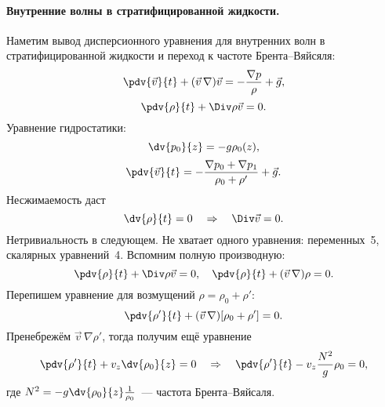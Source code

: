 \paragraph{Внутренние волны в стратифицированной жидкости. } Наметим вывод  дисперсионного уравнения для внутренних волн в стратифицированной жидкости и переход к частоте Брента--Вяйсяля:
\begin{equation}
    \pdv{\vec{v}}{t}+(\vec{v}\,\nabla)\vec{v} = -\frac{\nabla p}{\rho}+\vec{g},
\end{equation}
\begin{equation}
	\pdv{\rho}{t}+\Div \rho \vec{v} = 0.
\end{equation}
Уравнение гидростатики:
\begin{equation}
    \dv{p_0}{z} = -g \rho_0(z),
\end{equation}
\begin{equation}
    \pdv{\vec{v}}{t} = -\frac{\nabla p_0+\nabla p_1}{\rho_0+\rho'}+\vec{g}.
\end{equation}
Несжимаемость даст
\begin{equation}
    \dv{\rho}{t} = 0 \quad \Rightarrow \quad
    \Div \vec{v} = 0.
\end{equation}
Нетривиальность в следующем. Не хватает одного уравнения: переменных~5, скалярных уравнений~4.
Вспомним полную производную:
\begin{equation}
    \pdv{\rho}{t}+\Div \rho \vec{v} = 0, \quad
    \pdv{\rho}{t}+(\vec{v}\,\nabla)\rho = 0.
\end{equation}
Перепишем уравнение для возмущений $\rho = \rho_0+\rho'$:
\begin{equation}
    \pdv{\rho'}{t}+(\vec{v}\,\nabla)[\rho_0+\rho'] = 0.
\end{equation}
Пренебрежём $\vec{v}\,\nabla \rho'$, тогда получим ещё уравнение
\begin{equation}
    \pdv{\rho'}{t}+v_z\dv{\rho_0}{z} = 0
    \quad\Rightarrow\quad
    \pdv{\rho'}{t}-v_z \frac{N^2}{g}\rho_0 = 0,
\end{equation}
где $N^2=-g\dv{\rho_0}{z}\frac{1}{\rho_0}$~--- частота Брента--Вяйсаля.


